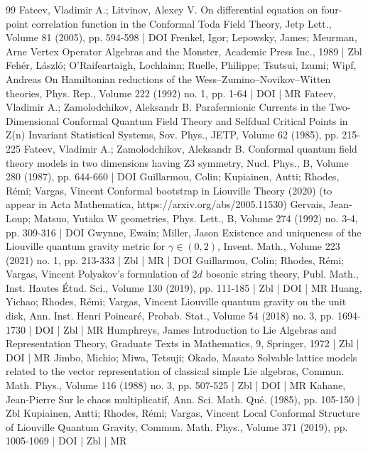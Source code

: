 \documentclass[10pt]{amsart}
\theoremstyle{definition}\newtheorem{defi}[theo]{Definition}\newtheorem{rema}[theo]{Remark}\newtheorem{exam}[theo]{Example}\newtheorem{exem}[theo]{Example}\newtheorem{nota}[theo]{Notation}
\begin{document}
\begin{thebibliography}{99}
Fateev, Vladimir A.; Litvinov, Alexey V. On differential equation on four-point correlation function in the Conformal Toda Field Theory, Jetp Lett., Volume 81 (2005), pp. 594-598 | DOI
Frenkel, Igor; Lepowsky, James; Meurman, Arne Vertex Operator Algebras and the Monster, Academic Press Inc., 1989 | Zbl
Fehér, László; O’Raifeartaigh, Lochlainn; Ruelle, Philippe; Tsutsui, Izumi; Wipf, Andreas On Hamiltonian reductions of the Wess–Zumino–Novikov–Witten theories, Phys. Rep., Volume 222 (1992) no. 1, pp. 1-64 | DOI | MR
Fateev, Vladimir A.; Zamolodchikov, Aleksandr B. Parafermionic Currents in the Two-Dimensional Conformal Quantum Field Theory and Selfdual Critical Points in Z(n) Invariant Statistical Systems, Sov. Phys., JETP, Volume 62 (1985), pp. 215-225
Fateev, Vladimir A.; Zamolodchikov, Aleksandr B. Conformal quantum field theory models in two dimensions having Z3 symmetry, Nucl. Phys., B, Volume 280 (1987), pp. 644-660 | DOI
Guillarmou, Colin; Kupiainen, Antti; Rhodes, Rémi; Vargas, Vincent Conformal bootstrap in Liouville Theory (2020) (to appear in Acta Mathematica, https://arxiv.org/abs/2005.11530)
Gervais, Jean-Loup; Matsuo, Yutaka W geometries, Phys. Lett., B, Volume 274 (1992) no. 3-4, pp. 309-316 | DOI
Gwynne, Ewain; Miller, Jason Existence and uniqueness of the Liouville quantum gravity metric for $\gamma \in (0,2)$, Invent. Math., Volume 223 (2021) no. 1, pp. 213-333 | Zbl | MR | DOI
Guillarmou, Colin; Rhodes, Rémi; Vargas, Vincent Polyakov’s formulation of $2d$ bosonic string theory, Publ. Math., Inst. Hautes Étud. Sci., Volume 130 (2019), pp. 111-185 | Zbl | DOI | MR
Huang, Yichao; Rhodes, Rémi; Vargas, Vincent Liouville quantum gravity on the unit disk, Ann. Inst. Henri Poincaré, Probab. Stat., Volume 54 (2018) no. 3, pp. 1694-1730 | DOI | Zbl | MR
Humphreys, James Introduction to Lie Algebras and Representation Theory, Graduate Texts in Mathematics, 9, Springer, 1972 | Zbl | DOI | MR
Jimbo, Michio; Miwa, Tetsuji; Okado, Masato Solvable lattice models related to the vector representation of classical simple Lie algebras, Commun. Math. Phys., Volume 116 (1988) no. 3, pp. 507-525 | Zbl | DOI | MR
Kahane, Jean-Pierre Sur le chaos multiplicatif, Ann. Sci. Math. Qué. (1985), pp. 105-150 | Zbl
Kupiainen, Antti; Rhodes, Rémi; Vargas, Vincent Local Conformal Structure of Liouville Quantum Gravity, Commun. Math. Phys., Volume 371 (2019), pp. 1005-1069 | DOI | Zbl | MR

\end{thebibliography}
\end{document}
